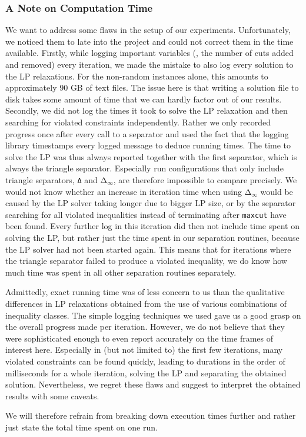 \subsubsection{A Note on Computation Time}
We want to address some flaws in the setup of our experiments.
Unfortunately, we noticed them to late into the project and could not correct them in the time available.
Firstly, while logging important variables (\eg, the number of cuts added and removed) every iteration, we made the mistake to also log every solution to the LP relaxations.
For the non-random instances alone, this amounts to approximately 90 GB of text files.
The issue here is that writing a solution file to disk takes some amount of time that we can hardly factor out of our results.
Secondly, we did not log the times it took to solve the LP relaxation and then searching for violated constraints independently.
Rather we only recorded progress once after every call to a separator and used the fact that the logging library timestamps every logged message to deduce running times.
The time to solve the LP was thus always reported together with the first separator, which is always the triangle separator.
Especially run configurations that only include triangle separators, \eg \texttt{Δ} and $\texttt{Δ}_{\infty}$, are therefore impossible to compare precisely.
We would not know whether an increase in iteration time when using $\texttt{Δ}_{\infty}$ would be caused by the LP solver taking longer due to bigger LP size, or by the separator searching for all violated inequalities instead of terminating after \texttt{maxcut} have been found.
Every further log in this iteration did then not include time spent on solving the LP, but rather just the time spent in our separation routines, because the LP solver had not been started again.
This means that for iterations where the triangle separator failed to produce a violated inequality, we do know how much time was spent in all other separation routines separately. 

Admittedly, exact running time was of less concern to us than the qualitative differences in LP relaxations obtained from the use of various combinations of inequality classes.
The simple logging techniques we used gave us a good grasp on the overall progress made per iteration.
However, we do not believe that they were sophisticated enough to even report accurately on the time frames of interest here.
Especially in (but not limited to) the first few iterations, many violated constraints can be found quickly, leading to durations in the order of milliseconds for a whole iteration, \ie solving the LP and separating the obtained solution.
Nevertheless, we regret these flaws and suggest to interpret the obtained results with some caveats.

We will therefore refrain from breaking down execution times further and rather just state the total time spent on one run.
